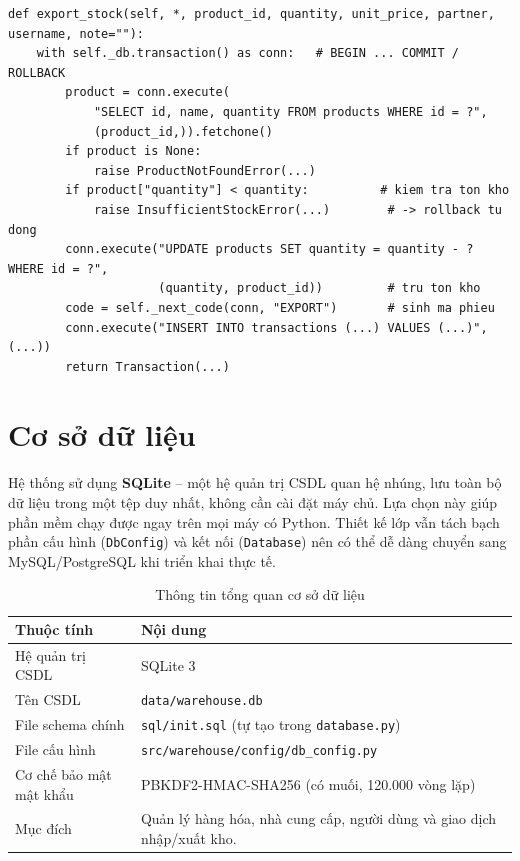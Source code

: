 \documentclass[12pt,a4paper]{report}
\begin{document}
\begin{lstlisting}[caption={Xử lý xuất kho với giao dịch CSDL (rút gọn)}]
def export_stock(self, *, product_id, quantity, unit_price, partner, username, note=""):
    with self._db.transaction() as conn:   # BEGIN ... COMMIT / ROLLBACK
        product = conn.execute(
            "SELECT id, name, quantity FROM products WHERE id = ?",
            (product_id,)).fetchone()
        if product is None:
            raise ProductNotFoundError(...)
        if product["quantity"] < quantity:          # kiem tra ton kho
            raise InsufficientStockError(...)        # -> rollback tu dong
        conn.execute("UPDATE products SET quantity = quantity - ? WHERE id = ?",
                     (quantity, product_id))         # tru ton kho
        code = self._next_code(conn, "EXPORT")       # sinh ma phieu
        conn.execute("INSERT INTO transactions (...) VALUES (...)", (...))
        return Transaction(...)
\end{lstlisting}

\section{Cơ sở dữ liệu}

Hệ thống sử dụng \textbf{SQLite} -- một hệ quản trị CSDL quan hệ nhúng, lưu toàn
bộ dữ liệu trong một tệp duy nhất, không cần cài đặt máy chủ. Lựa chọn này giúp
phần mềm chạy được ngay trên mọi máy có Python. Thiết kế lớp vẫn tách bạch phần
cấu hình (\texttt{DbConfig}) và kết nối (\texttt{Database}) nên có thể dễ dàng
chuyển sang MySQL/PostgreSQL khi triển khai thực tế.

\begin{table}[H]
\centering
\renewcommand{\arraystretch}{1.25}
\begin{tabularx}{\textwidth}{|L{4cm}|X|}
\hline
\textbf{Thuộc tính} & \textbf{Nội dung} \\ \hline
Hệ quản trị CSDL & SQLite 3 \\ \hline
Tên CSDL & \texttt{data/warehouse.db} \\ \hline
File schema chính & \texttt{sql/init.sql} (tự tạo trong \texttt{database.py}) \\ \hline
File cấu hình & \texttt{src/warehouse/config/db\_config.py} \\ \hline
Cơ chế bảo mật mật khẩu & PBKDF2-HMAC-SHA256 (có muối, 120.000 vòng lặp) \\ \hline
Mục đích & Quản lý hàng hóa, nhà cung cấp, người dùng và giao dịch nhập/xuất kho. \\ \hline
\end{tabularx}
\caption{Thông tin tổng quan cơ sở dữ liệu}
\end{table}
\end{document}
